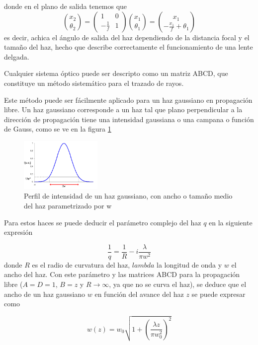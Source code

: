 donde en el plano de salida tenemos que
\[  {x_2 \choose \theta_2} = \begin{pmatrix} 1 & 0 \\ -\frac{1}{f} & 1 \end{pmatrix}{x_1 \choose \theta_1} = {x_1 \choose -\frac{x_1}{f} + \theta_1}\]
es decir, achica el ángulo de salida del haz dependiendo de la distancia focal y el tamaño del haz, hecho que describe correctamente el funcionamiento de una lente delgada.

Cualquier sistema óptico puede ser descripto como un matriz ABCD, que constituye un método sistemático para el trazado de rayos.

Este método puede ser fácilmente aplicado para un haz gaussiano en propagación libre. Un haz gaussiano corresponde a un haz tal que plano perpendicular a la dirección de propagación tiene una intensidad gaussiana o una campana o función de Gauss, como se ve en la figura \ref{fig:gaussian_beam_profile}

\begin{figure}[H]
\centering
\includegraphics[width=0.35\textwidth]{fig/gaussian_beam_profile}
\caption{Perfil de intensidad de un haz gaussiano, con ancho o tamaño medio del haz parametrizado por w}
\label{fig:gaussian_beam_profile}
\end{figure}

Para estos haces se puede deducir el parámetro complejo del haz $q$ en la siguiente expresión \cite{svelto} 

\begin{equation}
    \frac{1}{q} = \frac{1}{R} - i \frac{\lambda}{\pi w^2}
    \label{eq:perfilacion/beam_parameter}
\end{equation}
donde $R$ es el radio de curvatura del haz, $lambda$ la longitud de onda y $w$ el ancho del haz. Con este parámetro y las matrices ABCD para la propagación libre ($A=D=1$, $B=z$ y $R\to\infty$, ya que no se curva el haz), se deduce que el ancho de un haz gaussiano $w$ en función del avance del haz $z$ se puede expresar como

\begin{equation}
    w(z) = w_0 \sqrt{1 + \left(\frac{\lambda z}{\pi w_0^2}\right)^2}
    \label{eq:perfilacion/gauss_divergence}
\end{equation}

